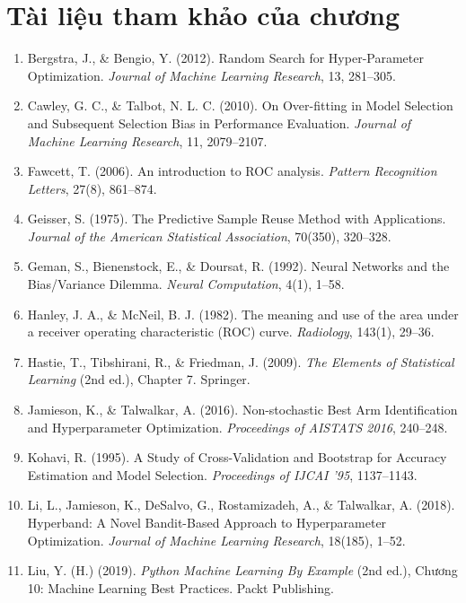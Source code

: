 \section*{Tài liệu tham khảo của chương}
\begin{enumerate}
    \item Bergstra, J., \& Bengio, Y. (2012). Random Search for Hyper-Parameter Optimization. \textit{Journal of Machine Learning Research}, 13, 281--305.
    \item Cawley, G. C., \& Talbot, N. L. C. (2010). On Over-fitting in Model Selection and Subsequent Selection Bias in Performance Evaluation. \textit{Journal of Machine Learning Research}, 11, 2079--2107.
    \item Fawcett, T. (2006). An introduction to ROC analysis. \textit{Pattern Recognition Letters}, 27(8), 861--874.
    \item Geisser, S. (1975). The Predictive Sample Reuse Method with Applications. \textit{Journal of the American Statistical Association}, 70(350), 320--328.
    \item Geman, S., Bienenstock, E., \& Doursat, R. (1992). Neural Networks and the Bias/Variance Dilemma. \textit{Neural Computation}, 4(1), 1--58.
    \item Hanley, J. A., \& McNeil, B. J. (1982). The meaning and use of the area under a receiver operating characteristic (ROC) curve. \textit{Radiology}, 143(1), 29--36.
    \item Hastie, T., Tibshirani, R., \& Friedman, J. (2009). \textit{The Elements of Statistical Learning} (2nd ed.), Chapter 7. Springer.
    \item Jamieson, K., \& Talwalkar, A. (2016). Non-stochastic Best Arm Identification and Hyperparameter Optimization. \textit{Proceedings of AISTATS 2016}, 240--248.
    \item Kohavi, R. (1995). A Study of Cross-Validation and Bootstrap for Accuracy Estimation and Model Selection. \textit{Proceedings of IJCAI '95}, 1137--1143.
    \item Li, L., Jamieson, K., DeSalvo, G., Rostamizadeh, A., \& Talwalkar, A. (2018). Hyperband: A Novel Bandit-Based Approach to Hyperparameter Optimization. \textit{Journal of Machine Learning Research}, 18(185), 1--52.
    \item Liu, Y. (H.) (2019). \textit{Python Machine Learning By Example} (2nd ed.), Chương 10: Machine Learning Best Practices. Packt Publishing.

\end{enumerate}
